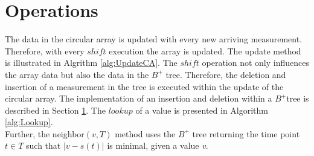 \documentclass[abstracton,12pt]{scrreprt}
\begin{document}
\section{Operations}
\label{sec:OperationsOnBTree}
The data in the circular array is updated with every new arriving measurement. Therefore, with every $shift$ execution the array is updated. The update method is illustrated in Algrithm \ref{alg:UpdateCA}. The $shift$ operation not only influences the array data but also the data in the $B^+$ tree. Therefore, the deletion and insertion of a measurement in the tree is executed within the update of the circular array. The implementation of an insertion and deletion within a $B^+$tree is described in Section \ref{sec:OperationsOnBTree}. The $lookup$ of a value is presented in Algorithm \ref{alg:Lookup}.
\\Further, the neighbor$(v,T)$ method uses the $B^+$ tree returning the time point $t \in T$ such that $|v-s(t)|$ is minimal, given a value \emph{v}.
\end{document}

